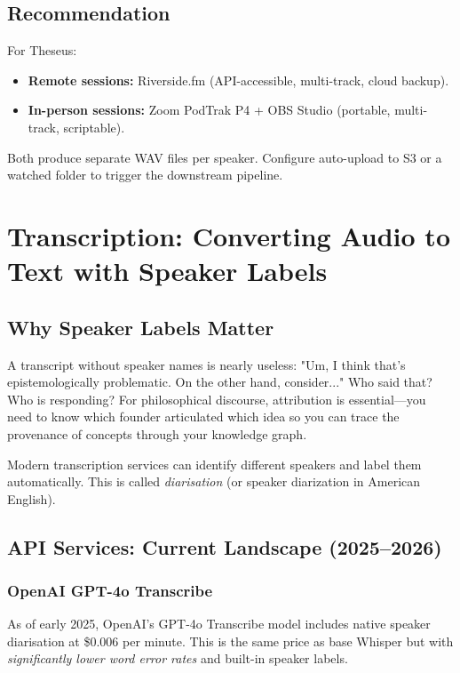 \documentclass[11pt,letterpaper]{article}
\begin{document}
\subsection{Recommendation}

For Theseus:

\begin{itemize}
  \item \textbf{Remote sessions:} Riverside.fm (API-accessible, multi-track, cloud backup).
  \item \textbf{In-person sessions:} Zoom PodTrak P4 + OBS Studio (portable, multi-track, scriptable).
\end{itemize}

Both produce separate WAV files per speaker. Configure auto-upload to S3 or a watched folder to trigger the downstream pipeline.

\vspace{12pt}

\section{Transcription: Converting Audio to Text with Speaker Labels}

\subsection{Why Speaker Labels Matter}

A transcript without speaker names is nearly useless: "Um, I think that's epistemologically problematic. On the other hand, consider..." Who said that? Who is responding? For philosophical discourse, attribution is essential—you need to know which founder articulated which idea so you can trace the provenance of concepts through your knowledge graph.

Modern transcription services can identify different speakers and label them automatically. This is called \textit{diarisation} (or speaker diarization in American English).

\subsection{API Services: Current Landscape (2025–2026)}

\subsubsection{OpenAI GPT-4o Transcribe}

As of early 2025, OpenAI's GPT-4o Transcribe model includes native speaker diarisation at \$0.006 per minute. This is the same price as base Whisper but with \textit{significantly lower word error rates} and built-in speaker labels.
\end{document}
